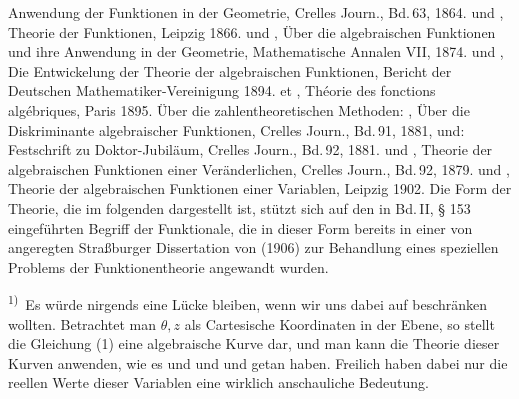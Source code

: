 \noindent Anwendung der  Funktionen in der Geometrie, Crelles
Journ., Bd.\,63, 1864.  und ,
Theorie der  Funktionen, Leipzig 1866.  und
, Über die algebraischen Funktionen und ihre
Anwendung in der Geometrie, Mathematische Annalen VII, 1874.
 und , Die Entwickelung der Theorie
der algebraischen Funktionen, Bericht der Deutschen
Mathematiker-Vereinigung 1894.  et ,
Théorie des fonctions algébriques, Paris 1895. Über die
zahlentheoretischen Methoden: , Über die
Diskriminante algebraischer Funktionen, Crelles Journ., Bd.\,91, 1881,
und: Festschrift zu  Doktor-Jubiläum, Crelles
Journ., Bd.\,92, 1881.  und ,
Theorie der algebraischen Funktionen einer Veränderlichen, Crelles
Journ., Bd.\,92, 1879.  und ,
Theorie der algebraischen Funktionen einer Variablen, Leipzig 1902.
Die Form der Theorie, die im folgenden dargestellt ist, stützt sich
auf den in Bd.\,II, § 153 eingeführten Begriff der Funktionale, die in
dieser Form bereits in einer von  angeregten
Straßburger Dissertation von  (1906) zur Behandlung
eines speziellen Problems der Funktionentheorie angewandt wurden.

\smallskip
\noindent\textsuperscript{1)}~Es würde nirgends eine Lücke bleiben,
wenn wir uns dabei auf  beschränken wollten.
Betrachtet man $\theta, z$ als Cartesische Koordinaten in der Ebene,
so stellt die Gleichung (1) eine algebraische Kurve dar, und man kann
die Theorie dieser Kurven anwenden, wie es  und
 und  und  getan
haben. Freilich haben dabei nur die reellen Werte dieser Variablen
eine wirklich anschauliche Bedeutung.
